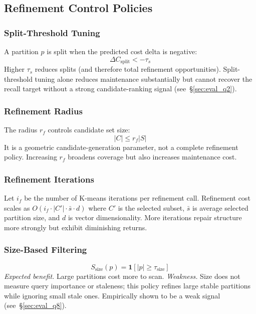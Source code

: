 \documentclass[sigconf, nonacm]{acmart}
\begin{document}
\subsection{Refinement Control Policies}

\subsubsection{Split-Threshold Tuning}
A partition $p$ is split when the predicted cost delta is negative:
\begin{equation}
  \Delta C_{\mathrm{split}} < -\tau_s
\end{equation}
Higher $\tau_s$ reduces splits (and therefore total refinement
opportunities). Split-threshold tuning alone reduces maintenance
substantially but cannot recover the recall target without a strong
candidate-ranking signal (see~\S\ref{sec:eval_q2}).

\subsubsection{Refinement Radius}
The radius $r_f$ controls candidate set size:
\begin{equation}
  |C| \leq r_f |S|
\end{equation}
It is a geometric candidate-generation parameter, not a complete
refinement policy. Increasing $r_f$ broadens coverage but also
increases maintenance cost.

\subsubsection{Refinement Iterations}
Let $i_f$ be the number of K-means iterations per refinement call.
Refinement cost scales as $O(i_f \cdot |C'| \cdot \bar{s} \cdot d)$
where $C'$ is the selected subset, $\bar{s}$ is average selected
partition size, and $d$ is vector dimensionality. More iterations
repair structure more strongly but exhibit diminishing returns.

\subsubsection{Size-Based Filtering}
\begin{equation}
  S_{\mathrm{size}}(p) = \mathbf{1}[|p| \geq \tau_{\mathrm{size}}]
\end{equation}
\textit{Expected benefit.} Large partitions cost more to scan.
\textit{Weakness.} Size does not measure query importance or staleness;
this policy refines large stable partitions while ignoring small
stale ones. Empirically shown to be a weak signal (see~\S\ref{sec:eval_q8}).
\end{document}
